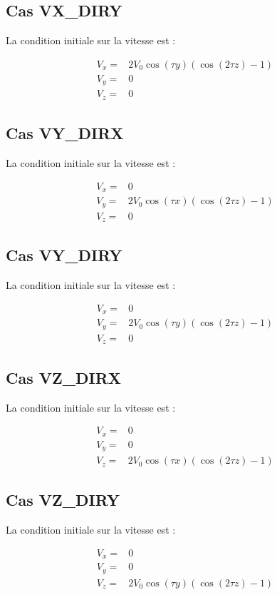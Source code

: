 \subsection{Cas VX\_DIRY}

La condition initiale sur la vitesse est :

\begin{align*}
V_x ={}& 2 V_0 \cos(\tau y) (\cos(2 \tau z) - 1) \\
V_y ={}& 0 \\
V_z ={}& 0
\end{align*}

\subsection{Cas VY\_DIRX}

La condition initiale sur la vitesse est :

\begin{align*}
V_x ={}& 0 \\
V_y ={}& 2 V_0 \cos(\tau x) (\cos(2 \tau z) - 1) \\
V_z ={}& 0
\end{align*}

\subsection{Cas VY\_DIRY}

La condition initiale sur la vitesse est :

\begin{align*}
V_x ={}& 0 \\
V_y ={}& 2 V_0 \cos(\tau y) (\cos(2 \tau z) - 1) \\
V_z ={}& 0
\end{align*}

\subsection{Cas VZ\_DIRX}

La condition initiale sur la vitesse est :

\begin{align*}
V_x ={}& 0 \\
V_y ={}& 0 \\
V_z ={}& 2 V_0 \cos(\tau x) (\cos(2 \tau z) - 1)
\end{align*}

\subsection{Cas VZ\_DIRY}

La condition initiale sur la vitesse est :

\begin{align*}
V_x ={}& 0 \\
V_y ={}& 0 \\
V_z ={}& 2 V_0 \cos(\tau y) (\cos(2 \tau z) - 1)
\end{align*}

